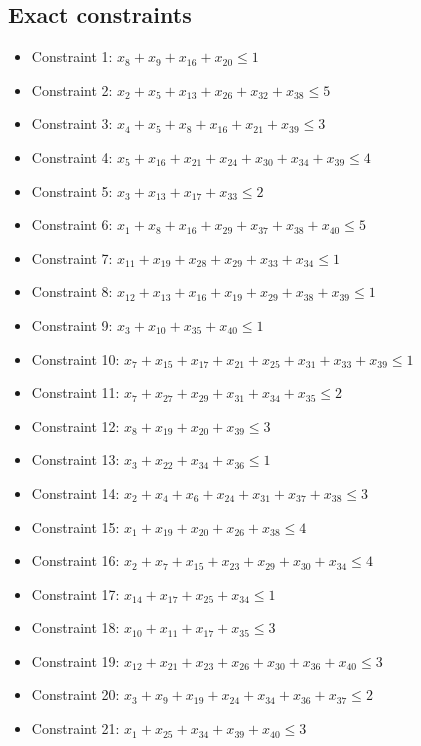 \documentclass[11pt]{article}
\begin{document}
\subsection*{Exact constraints}
\begin{itemize}
\item Constraint 1: $x_{8} + x_{9} + x_{16} + x_{20} \le 1$
\item Constraint 2: $x_{2} + x_{5} + x_{13} + x_{26} + x_{32} + x_{38} \le 5$
\item Constraint 3: $x_{4} + x_{5} + x_{8} + x_{16} + x_{21} + x_{39} \le 3$
\item Constraint 4: $x_{5} + x_{16} + x_{21} + x_{24} + x_{30} + x_{34} + x_{39} \le 4$
\item Constraint 5: $x_{3} + x_{13} + x_{17} + x_{33} \le 2$
\item Constraint 6: $x_{1} + x_{8} + x_{16} + x_{29} + x_{37} + x_{38} + x_{40} \le 5$
\item Constraint 7: $x_{11} + x_{19} + x_{28} + x_{29} + x_{33} + x_{34} \le 1$
\item Constraint 8: $x_{12} + x_{13} + x_{16} + x_{19} + x_{29} + x_{38} + x_{39} \le 1$
\item Constraint 9: $x_{3} + x_{10} + x_{35} + x_{40} \le 1$
\item Constraint 10: $x_{7} + x_{15} + x_{17} + x_{21} + x_{25} + x_{31} + x_{33} + x_{39} \le 1$
\item Constraint 11: $x_{7} + x_{27} + x_{29} + x_{31} + x_{34} + x_{35} \le 2$
\item Constraint 12: $x_{8} + x_{19} + x_{20} + x_{39} \le 3$
\item Constraint 13: $x_{3} + x_{22} + x_{34} + x_{36} \le 1$
\item Constraint 14: $x_{2} + x_{4} + x_{6} + x_{24} + x_{31} + x_{37} + x_{38} \le 3$
\item Constraint 15: $x_{1} + x_{19} + x_{20} + x_{26} + x_{38} \le 4$
\item Constraint 16: $x_{2} + x_{7} + x_{15} + x_{23} + x_{29} + x_{30} + x_{34} \le 4$
\item Constraint 17: $x_{14} + x_{17} + x_{25} + x_{34} \le 1$
\item Constraint 18: $x_{10} + x_{11} + x_{17} + x_{35} \le 3$
\item Constraint 19: $x_{12} + x_{21} + x_{23} + x_{26} + x_{30} + x_{36} + x_{40} \le 3$
\item Constraint 20: $x_{3} + x_{9} + x_{19} + x_{24} + x_{34} + x_{36} + x_{37} \le 2$
\item Constraint 21: $x_{1} + x_{25} + x_{34} + x_{39} + x_{40} \le 3$

\end{itemize}
\end{document}
